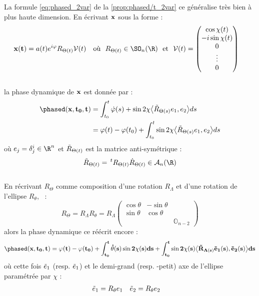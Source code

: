 \begin{proposition}\label{prop:phased_nvar}
	La formule \ref{eq:phased_2var} de la \cref{prop:phased/t_2var} ce généralise très bien à plus haute dimension. En écrivant $\bf{x}$ sous la forme :
	\begin{align}\label{eq:exp_elliptik_nvar}
		\bf{x}(t) &= a(t)e^{i\varphi} R_{\Theta(t)} \mathcal{V}(t)  &  \text{où }\ R_{\Theta(t)} \in\SO_n(\R)  \ \text{ et }\  \mathcal{V}(t) &= \begin{pmatrix} \cos\chi(t) \\ -i\sin\chi(t) \\ 0 \\ \vdots \\ 0 \end{pmatrix}
	\end{align}
	\\
	la phase dynamique de $\bf{x}$ est donnée par :
	\begin{equation}\label{eq:phased_nvar-v1}
		\begin{aligned}
			\phased(\bf{x}, t_0,t) &= \int_{t_0}^t \dot{\varphi}(s) + \sin2\chi \big\langle \Tilde{R}_{\Theta(s)} e_1, e_2\big\rangle ds \\
			&= \varphi(t) -\varphi(t_0) + \int_{t_0}^t \sin2\chi \big\langle \Tilde{R}_{\Theta(s)} e_1, e_2\big\rangle ds
		\end{aligned}
	\end{equation}
	où $e_j=\delta^i_j\in\R^n$ et $\Tilde{R}_{\Theta(t)}$ est la matrice anti-symétrique :
	\[\Tilde{R}_{\Theta(t)} =\, ^tR_{\Theta(t)} \dot{R}_{\Theta(t)}\in\mathcal{A}_n(\R)\]
	\\
	En récrivant $R_\Theta$ comme composition d'une rotation $R_\Lambda$ et d'une rotation de l'ellipse $R_\theta$, \ie~:
	\[R_\Theta = R_\Lambda R_\theta = R_\Lambda \begin{pmatrix}\cos\theta & -\sin\theta \\ \sin\theta & \cos\theta \\ & & \mathbb{O}_{n-2}
	\end{pmatrix}\]
	alors la phase dynamique ce réécrit encore :
	\begin{equation}\label{eq:phased_nvar-v2}
		\phased(\bf{x}, t_0,t) = \varphi(t) -\varphi(t_0) + \int_{t_0}^t \dot{\theta}(s) \sin2\chi(s) ds + \int_{t_0}^t \sin2\chi(s) \big\langle \Tilde{R}_{\Lambda(s)} \Tilde{e}_1(s),  \Tilde{e}_2(s)\big\rangle ds
	\end{equation}
	où cette fois $\Tilde{e}_1$ (resp. $\Tilde{e}_1$) et le demi-grand (resp. -petit) axe de l'ellipse paramétrée par $\chi$ :
	\begin{align*}
		 \Tilde{e}_1 &= R_\theta e_1  &   \Tilde{e}_2 &= R_\theta e_2
	\end{align*}
\end{proposition}

